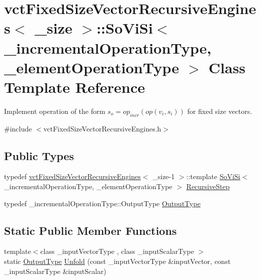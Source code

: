\hypertarget{classvct_fixed_size_vector_recursive_engines_1_1_so_vi_si}{}\section{vct\+Fixed\+Size\+Vector\+Recursive\+Engines$<$ \+\_\+size $>$\+:\+:So\+Vi\+Si$<$ \+\_\+incremental\+Operation\+Type, \+\_\+element\+Operation\+Type $>$ Class Template Reference}
\label{classvct_fixed_size_vector_recursive_engines_1_1_so_vi_si}


Implement operation of the form $s_o = op_{incr}(op(v_i, s_i))$ for fixed size vectors.  




{\ttfamily \#include $<$vct\+Fixed\+Size\+Vector\+Recursive\+Engines.\+h$>$}

\subsection*{Public Types}
\begin{DoxyCompactItemize}
\item 
typedef \hyperlink{classvct_fixed_size_vector_recursive_engines}{vct\+Fixed\+Size\+Vector\+Recursive\+Engines}$<$ \+\_\+size-\/1 $>$\+::template \hyperlink{classvct_fixed_size_vector_recursive_engines_1_1_so_vi_si}{So\+Vi\+Si}$<$ \+\_\+incremental\+Operation\+Type, \+\_\+element\+Operation\+Type $>$ \hyperlink{classvct_fixed_size_vector_recursive_engines_1_1_so_vi_si_a595f643d9cca8d3c8a84a4c680679ad0}{Recursive\+Step}
\item 
typedef \+\_\+incremental\+Operation\+Type\+::\+Output\+Type \hyperlink{classvct_fixed_size_vector_recursive_engines_1_1_so_vi_si_a44d1ef1068c419fc926e4fd821d08402}{Output\+Type}
\end{DoxyCompactItemize}
\subsection*{Static Public Member Functions}
\begin{DoxyCompactItemize}
\item 
{\footnotesize template$<$class \+\_\+input\+Vector\+Type , class \+\_\+input\+Scalar\+Type $>$ }\\static \hyperlink{classvct_fixed_size_vector_recursive_engines_1_1_so_vi_si_a44d1ef1068c419fc926e4fd821d08402}{Output\+Type} \hyperlink{classvct_fixed_size_vector_recursive_engines_1_1_so_vi_si_a06e896ac6b470c5cf0427ab841c7c75c}{Unfold} (const \+\_\+input\+Vector\+Type \&input\+Vector, const \+\_\+input\+Scalar\+Type \&input\+Scalar)
\end{DoxyCompactItemize}


